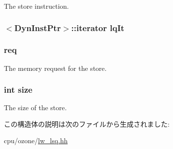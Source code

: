 \label{structOzoneLWLSQ_1_1SQEntry_af5d4fb974eeb4507d4c837d365d0cefc}
The store instruction. \hypertarget{structOzoneLWLSQ_1_1SQEntry_a2577e9f27485807aed8aa5e8602595d7}{
\subsubsection[{lqIt}]{$<${\bf DynInstPtr}$>$::iterator {\bf lqIt}}}
\label{structOzoneLWLSQ_1_1SQEntry_a2577e9f27485807aed8aa5e8602595d7}
\hypertarget{structOzoneLWLSQ_1_1SQEntry_a956cd41d82347558b9c0a5b0474903f2}{
\subsubsection[{req}]{ {\bf req}}}
\label{structOzoneLWLSQ_1_1SQEntry_a956cd41d82347558b9c0a5b0474903f2}
The memory request for the store. \hypertarget{structOzoneLWLSQ_1_1SQEntry_a439227feff9d7f55384e8780cfc2eb82}{
\subsubsection[{size}]{\setlength{\rightskip}{0pt plus 5cm}int {\bf size}}}
\label{structOzoneLWLSQ_1_1SQEntry_a439227feff9d7f55384e8780cfc2eb82}
The size of the store. 

この構造体の説明は次のファイルから生成されました:\begin{DoxyCompactItemize}
\item 
cpu/ozone/\hyperlink{lw__lsq_8hh}{lw\_\-lsq.hh}\end{DoxyCompactItemize}
